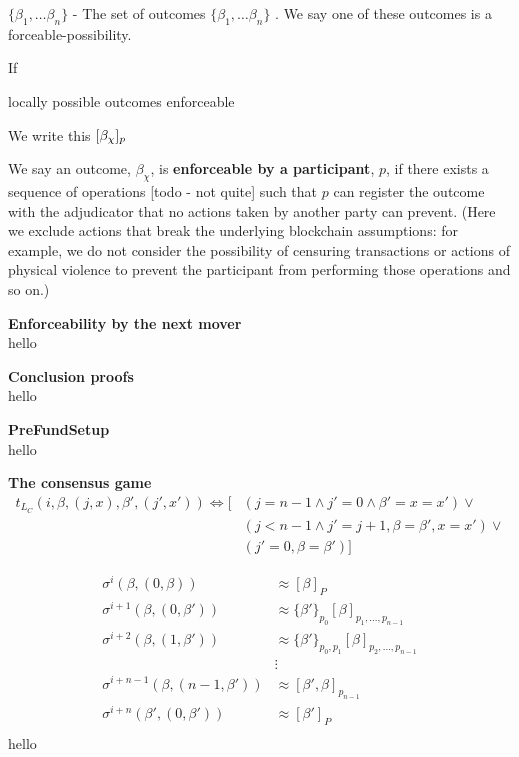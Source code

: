 $\{\beta_1, \dots \beta_n \}$ - 
The set of outcomes $\{\beta_1, \dots \beta_n\}$ 
. We say one of these outcomes is a forceable-possibility.

If 

locally possible outcomes
enforceable

We write this $[\beta_\chi]_p$

We say an outcome, $\beta_\chi$, is \textbf{enforceable by a participant}, $p$, if there exists a sequence of operations [todo - not quite] such that $p$ can register the outcome with the adjudicator that no actions taken by another party can prevent. (Here we exclude actions that break the underlying blockchain assumptions: for example, we do not consider the possibility of censuring transactions or actions of physical violence to prevent the participant from performing those operations and so on.)


\begin{exmp}
  \textbf{Enforceability by the next mover} \\
  hello
\end{exmp}

\begin{exmp}
  \textbf{Conclusion proofs} \\
  hello
\end{exmp}

\begin{exmp}
  \textbf{PreFundSetup} \\
  hello
\end{exmp}

\begin{exmp}
  \textbf{The consensus game} \\
  \begin{align*}
    t_{L_C}(i, \beta, (j, x), \beta', (j', x')) \Leftrightarrow
      [ & (j=n-1 \wedge j'= 0 \wedge \beta' = x = x')  \vee \\
      & (j < n-1 \wedge j' = j+1, \beta = \beta', x = x') \vee \\
      & (j'=0, \beta = \beta') ]
  \end{align*}

  \begin{align*}
    \sigma^{i}(\beta, (0, \beta)) & \approx [\beta]_P \\
    \sigma^{i+1}(\beta, (0, \beta')) & \approx \{\beta'\}_{p_0}[\beta]_{p_1, ..., p_{n-1}} \\
    \sigma^{i+2}(\beta, (1, \beta')) & \approx \{\beta'\}_{p_0, p_1}[\beta]_{p_2, ..., p_{n-1}} \\
    &\vdots\\
    \sigma^{i+n-1}(\beta, (n-1, \beta')) & \approx [\beta', \beta]_{p_{n-1}} \\
    \sigma^{i+n}(\beta', (0, \beta')) & \approx [\beta']_{P} \\
  \end{align*}
    hello
\end{exmp}

